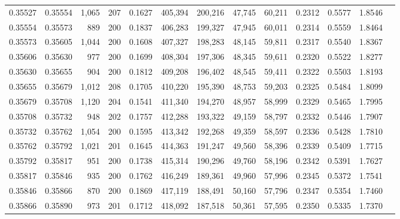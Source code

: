 \begin{tabular}{rrrrrrrrrrrrr}
0.35527 & 0.35554 & 1,065 & 207 &                                     0.1627 & 405,394 & 200,216 &  47,745 &  60,211 & 0.2312 & 0.5577 & 1.8546 \\
0.35554 & 0.35573 &   889 & 200 &                                     0.1837 & 406,283 & 199,327 &  47,945 &  60,011 & 0.2314 & 0.5559 & 1.8464 \\
0.35573 & 0.35605 & 1,044 & 200 &                                     0.1608 & 407,327 & 198,283 &  48,145 &  59,811 & 0.2317 & 0.5540 & 1.8367 \\
0.35606 & 0.35630 &   977 & 200 &                                     0.1699 & 408,304 & 197,306 &  48,345 &  59,611 & 0.2320 & 0.5522 & 1.8277 \\
0.35630 & 0.35655 &   904 & 200 &                                     0.1812 & 409,208 & 196,402 &  48,545 &  59,411 & 0.2322 & 0.5503 & 1.8193 \\
0.35655 & 0.35679 & 1,012 & 208 &                                     0.1705 & 410,220 & 195,390 &  48,753 &  59,203 & 0.2325 & 0.5484 & 1.8099 \\
0.35679 & 0.35708 & 1,120 & 204 &                                     0.1541 & 411,340 & 194,270 &  48,957 &  58,999 & 0.2329 & 0.5465 & 1.7995 \\
0.35708 & 0.35732 &   948 & 202 &                                     0.1757 & 412,288 & 193,322 &  49,159 &  58,797 & 0.2332 & 0.5446 & 1.7907 \\
0.35732 & 0.35762 & 1,054 & 200 &                                     0.1595 & 413,342 & 192,268 &  49,359 &  58,597 & 0.2336 & 0.5428 & 1.7810 \\
0.35762 & 0.35792 & 1,021 & 201 &                                     0.1645 & 414,363 & 191,247 &  49,560 &  58,396 & 0.2339 & 0.5409 & 1.7715 \\
0.35792 & 0.35817 &   951 & 200 &                                     0.1738 & 415,314 & 190,296 &  49,760 &  58,196 & 0.2342 & 0.5391 & 1.7627 \\
0.35817 & 0.35846 &   935 & 200 &                                     0.1762 & 416,249 & 189,361 &  49,960 &  57,996 & 0.2345 & 0.5372 & 1.7541 \\
0.35846 & 0.35866 &   870 & 200 &                                     0.1869 & 417,119 & 188,491 &  50,160 &  57,796 & 0.2347 & 0.5354 & 1.7460 \\
0.35866 & 0.35890 &   973 & 201 &                                     0.1712 & 418,092 & 187,518 &  50,361 &  57,595 & 0.2350 & 0.5335 & 1.7370 \\

\end{tabular}
